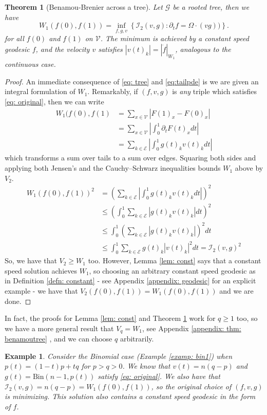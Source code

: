 \documentclass[conference]{IEEEtran}
\newcommand{\GG}{\mathcal{G}}
\newcommand{\VV}{\mathcal{V}}
\newcommand{\EE}{\mathcal{E}}
\newcommand{\bin}{\text{Bin}}
\theoremstyle{ieeestyle}
\newtheorem{thm}{Theorem}
\newtheorem{exam}{Example}
\begin{document}
\begin{thm}[Benamou-Brenier across a tree]\label{thm: benamoutree}
    Let $\GG$ be a rooted tree, then we have
    \begin{equation}\label{eq: tree ben}
W_1(f(0),f(1)) = \inf_{f,g,v}\left\{\mathcal{I}_2(v,g) : \partial_t f = \Omega \cdot(vg)) \right\}.
\end{equation}
for all $f(0)$ and $f(1)$ on $\VV$. The minimum is achieved by a constant speed geodesic $f$, and the velocity $v$ satisfies $|v(t)_k| = |\dot{f}|_{W_1}$, analogous to the continuous case.
\end{thm}
\begin{proof}
    An immediate consequence of \eqref{eq: tree} and \eqref{eq:tailpde} is we are given an integral formulation of $W_1$. Remarkably, if $(f,v,g)$ is \textit{any} triple which satisfies \eqref{eq: original}, then we can write
    \begin{align*}
        W_1(f(0),f(1) &= \sum_{x \in \VV} | F(1)_x - F(0)_x| \\
        &= \sum_{x \in \VV} \left| \int_0^1 \partial_t F(t)_x dt \right| \\
        &= \sum_{k \in \EE} \left| \int_0^1 g(t)_kv(t)_k dt \right|
    \end{align*}
    which transforms a sum over tails to a sum over edges. Squaring both sides and applying both Jensen's and the Cauchy--Schwarz inequalities bounds $W_1$ above by $V_2$.
    \begin{align*}
        W_1(f(0),f(1))^2 &= \left( \sum_{k \in \EE} \left| \int_0^1 g(t)_kv(t)_kdt \right|\right)^2 \\
        &\leq \left( \int_0^1 \sum_{k \in \EE} |g(t)_kv(t)_k| dt \right)^2\\
        &\leq \int_0^1 \left( \sum_{k \in \EE} |g(t)_kv(t)_k|\right)^2 dt \\
        &\leq \int_0^1 \sum_{k \in \EE} g(t)_k|v(t)_k|^2 dt  = \mathcal{I}_2(v,g)^2
    \end{align*}
    So, we have that $V_2 \geq W_1$ too. However, Lemma \ref{lem: const} says that a constant speed solution achieves $W_1$, so choosing an arbitrary constant speed geodesic as in Definition \ref{defn: constant} - see Appendix \ref{appendix: geodesic} for an explicit example - we have that $V_2(f(0),f(1)) = W_1(f(0),f(1))$ and we are done.
\end{proof}
In fact, the proofs for Lemma \ref{lem: const} and Theorem \ref{thm: benamoutree} work for $q \geq 1$ too, so we have a more general result that $V_q = W_1$, see Appendix \ref{appendix: thm: benamoutree} , and we can choose $q$ arbitrarily.
\begin{exam}\label{examp: bin}
    Consider the Binomial case (Example \ref{examp: bin1}) when $p(t) = (1-t)p + tq$ for $p > q > 0$. We know that $v(t) =  n(q-p)$ and $g(t) = \bin(n-1,p(t))$ satisfy \eqref{eq: original}. We also have that $\mathcal{I}_2(v,g) = n(q-p) = W_1(f(0),f(1))$,
    so the original choice of $(f,v,g)$ is minimizing. This solution also contains a constant speed geodesic in the form of $f$.
\end{exam}
\end{document}
